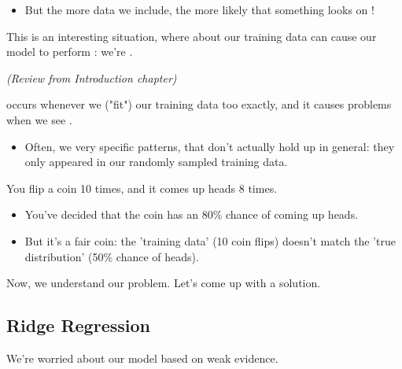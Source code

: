         \begin{itemize}
            \item But the more data we include, the more likely that something looks  on !
        \end{itemize}

        This is an interesting situation, where  about our training data can cause our model to perform : we're .
            \\

        \begin{definition}
            \textit{(Review from Introduction chapter)}

             occurs whenever we  ("fit") our training data too exactly, and it causes problems when we see .

            \begin{itemize}
                \item Often, we  very specific patterns, that don't actually hold up in general: they only appeared in our randomly sampled training data. 
            \end{itemize}
        \end{definition}

        \miniex You flip a coin 10 times, and it comes up heads 8 times.

        \begin{itemize}
            \item You've decided that the coin has an 80\% chance of coming up heads.

            \item But it's a fair coin: the 'training data' (10 coin flips) doesn't match the 'true distribution' (50\% chance of heads).
        \end{itemize}

        Now, we understand our problem. Let's come up with a solution.


    \phantom{}

    \subsection{Ridge Regression}

        We're worried about our model  based on weak evidence.

